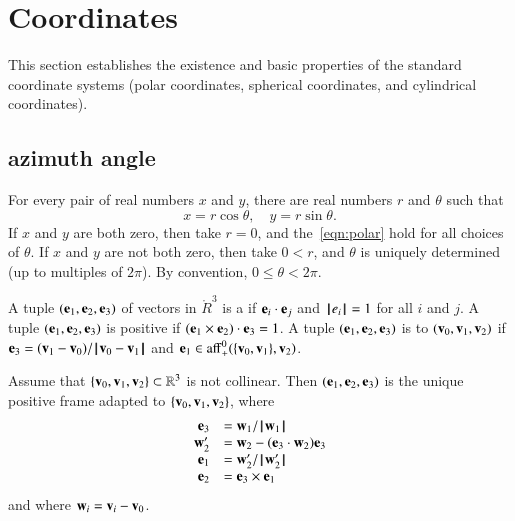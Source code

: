 \section{Coordinates}

This  section  establishes the existence
and basic properties of the standard coordinate systems
(polar coordinates, spherical coordinates, and cylindrical
coordinates).  
%
%
%

\subsection{azimuth angle}

\label{sec:polar}
%
%


For every pair of real numbers $x$ and $y$,  there are real numbers
$r$ and $\theta$ such that
    \begin{equation}\label{eqn:polar}
    x = r\cos\theta,\quad y = r\sin\theta.
    \end{equation}
If $x$ and $y$ are both zero, then take $r=0$, and the~\eqref{eqn:polar} hold for all choices of $\theta$. If $x$
and $y$ are not both zero, then take $0<r$, and $\theta$ is
uniquely determined (up to multiples of $2\pi$).  By convention, 
$0\le\theta < 2\pi$.
%
%







\begin{definition}
A tuple $(\e_1,\e_2,\e_3)$ of vectors in $\ring{R}^3$ is a 
 if $\e_i\cdot \e_j$ and $\normo{e_i}=1$ 
for all $i$ and $j$.
A tuple $(\e_1,\e_2,\e_3)$ is positive if $(\e_1\times \e_2)\cdot\e_3=1$.
A tuple $(\e_1,\e_2,\e_3)$ is  to $(\v_0,\v_1,\v_2)$ if
$\e_3 = (\v_1-\v_0)/\norm{\v_0}{\v_1}$ and
$\e_1\in\op{aff}_+^0(\{\v_0,\v_1\},\v_2)$.
\end{definition}
%
%

\begin{lemma}[orthonormalization]
Assume that $\{\v_0,\v_1,\v_2\}\subset\ring{R}^3$  is not collinear.  Then
$(\e_1,\e_2,\e_3)$ is the  unique positive frame 
adapted to $\{\v_0,\v_1,\v_2\}$, where
$$
\begin{array}{rll}
   \e_3 &= \w_1/\normo{\w_1}\\
   \w_2' &= \w_2 - (\e_3\cdot \w_2) \e_3\\
   \e_1 &= \w_2'/\normo{\w_2'}\\
   \e_2 &= \e_3 \times \e_1 \\
\end{array}
$$
and where $\w_i = \v_i - \v_0$.
\end{lemma}

